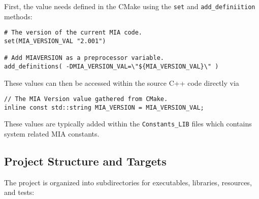 First, the value needs defined in the CMake using the \texttt{set} and \texttt{add\_definiition} methods:
\begin{lstlisting}[style=shellstyle]
# The version of the current MIA code.
set(MIA_VERSION_VAL "2.001")

# Add MIAVERSION as a preprocessor variable.
add_definitions( -DMIA_VERSION_VAL=\"${MIA_VERSION_VAL}\" )
\end{lstlisting}
These values can then be accessed within the source C++ code directly via
\begin{lstlisting}[style=cppstyle]
// The MIA Version value gathered from CMake.
inline const std::string MIA_VERSION = MIA_VERSION_VAL;
\end{lstlisting}
These values are typically added within the \texttt{Constants\_LIB} files which contains system related MIA constants. 

\subsection{Project Structure and Targets}

The project is organized into subdirectories for executables, libraries, resources, and tests:

